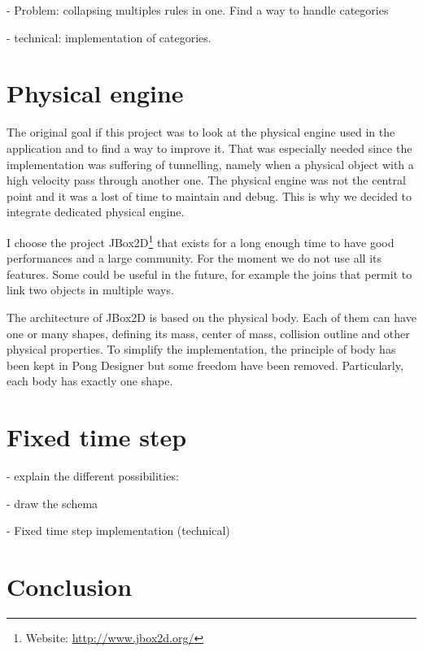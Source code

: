 \documentclass[11pt,a4paper]{article}
\begin{document}
- Problem: collapsing multiples rules in one. Find a way to handle categories

- technical: implementation of categories.

\section{Physical engine}
The original goal if this project was to look at the physical engine used in the application and to find a way to improve it. That was especially needed since the implementation was suffering of tunnelling, namely when a physical object with a high velocity pass through another one. The physical engine was not the central point and it was a lost of time to maintain and debug. This is why we decided to integrate dedicated physical engine. 

I choose the project JBox2D\footnote{Website: \url{http://www.jbox2d.org/}} that exists for a long enough time to have good performances and a large community. For the moment we do not use all its features. Some could be useful in the future, for example the joins that permit to link two objects in multiple ways.

The architecture of JBox2D is based on the physical body. Each of them can have one or many shapes, defining its mass, center of mass, collision outline and other physical properties. To simplify the implementation, the principle of body has been kept in Pong Designer but some freedom have been removed. Particularly, each body has exactly one shape.

\section{Fixed time step}

- explain the different possibilities:
  
- draw the schema

- Fixed time step implementation (technical)



\section{Conclusion}
\end{document}
